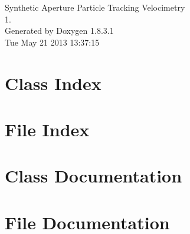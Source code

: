 \documentclass{book}
\begin{document}
\hypersetup{pageanchor=false,citecolor=blue}
\begin{titlepage}
\vspace*{7cm}
\begin{center}
{\Large Synthetic Aperture Particle Tracking Velocimetry \\[1ex]\large 1. }\\
\vspace*{1cm}
{\large Generated by Doxygen 1.8.3.1}\\
\vspace*{0.5cm}
{\small Tue May 21 2013 13:37:15}\\
\end{center}
\end{titlepage}
\clearemptydoublepage
{}
\tableofcontents
\clearemptydoublepage
{}
\hypersetup{pageanchor=true,citecolor=blue}
\chapter{Class Index}

\chapter{File Index}

\chapter{Class Documentation}


















\chapter{File Documentation}























\printindex
\end{document}
